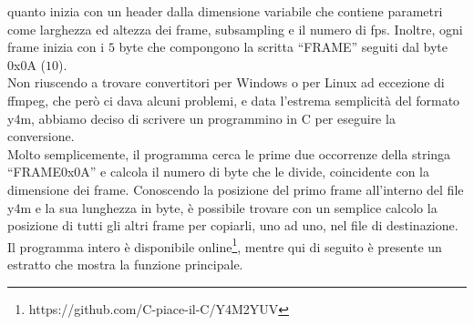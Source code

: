 quanto inizia con un header dalla dimensione variabile che contiene parametri 
come larghezza ed altezza dei frame, subsampling e il numero di fps. Inoltre, 
ogni frame inizia con i $5$ byte che compongono la scritta ``FRAME'' seguiti 
dal byte 0x0A ($10$).\\
Non riuscendo a trovare convertitori per Windows o per Linux ad eccezione di 
ffmpeg, che però ci dava alcuni problemi, e data l'estrema semplicità del 
formato y4m, abbiamo deciso di scrivere un programmino in C per eseguire la 
conversione.\\
Molto semplicemente, il programma cerca le prime due occorrenze della stringa   
``FRAME0x0A'' e calcola il numero di byte che le divide, coincidente con la 
dimensione dei frame. Conoscendo la posizione del primo frame all'interno del 
file y4m e la sua lunghezza in byte, è possibile trovare con un semplice 
calcolo la posizione di tutti gli altri frame per copiarli, uno ad uno, nel 
file di destinazione.
Il programma intero è disponibile 
online\footnote{https://github.com/C-piace-il-C/Y4M2YUV}, mentre qui di seguito 
è presente un estratto che mostra la funzione principale.
\begin{center}

\end{center}
